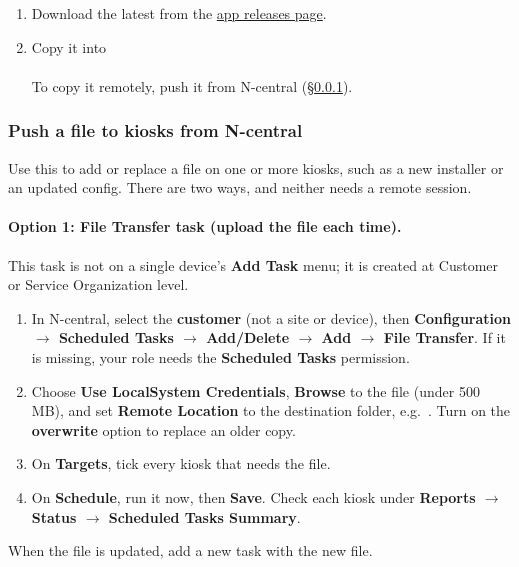 \documentclass[a4paper,10pt]{article}
\begin{document}
\begin{enumerate}
  \item Download the latest  from the
        \href{https://github.com/WeKnowTechnology/wkg-electron-app/releases}{app
        releases page}.

  \item Copy it into\\
        \\
        To copy it remotely, push it from N-central (\S\ref{sec:filepush}).
\end{enumerate}

\subsubsection{Push a file to kiosks from N-central}\label{sec:filepush}

Use this to add or replace a file on one or more kiosks, such as a new
installer or an updated config. There are two ways, and neither needs a
remote session.

\paragraph{Option 1: File Transfer task (upload the file each time).}
This task is not on a single device's \textbf{Add Task} menu; it is
created at Customer or Service Organization level.
\begin{enumerate}
  \item In N-central, select the \textbf{customer} (not a site or
        device), then \textbf{Configuration $\rightarrow$ Scheduled Tasks
        $\rightarrow$ Add/Delete $\rightarrow$ Add $\rightarrow$ File
        Transfer}. If it is missing, your role needs the
        \textbf{Scheduled Tasks} permission.
  \item Choose \textbf{Use LocalSystem Credentials}, \textbf{Browse} to
        the file (under 500\,MB), and set \textbf{Remote Location} to the
        destination folder, e.g.\
        .
        Turn on the \textbf{overwrite} option to replace an older copy.
  \item On \textbf{Targets}, tick every kiosk that needs the file.
  \item On \textbf{Schedule}, run it now, then \textbf{Save}. Check each
        kiosk under \textbf{Reports $\rightarrow$ Status $\rightarrow$
        Scheduled Tasks Summary}.
\end{enumerate}
When the file is updated, add a new task with the new file.
\end{document}
